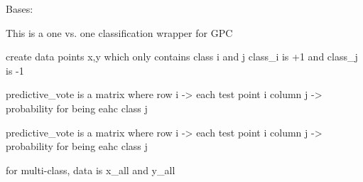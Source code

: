 \documentclass[letterpaper,10pt,english]{sphinxmanual}
\begin{document}

\begin{fulllineitems}
\label{pyGPs.Core:pyGPs.Core.gp.GPMC}
Bases: 

This is a one vs. one classification wrapper for GPC

\begin{fulllineitems}
\label{pyGPs.Core:pyGPs.Core.gp.GPMC.createBinaryClass}
create data points x,y which only contains class i and j
class\_i is +1 and class\_j is -1

\end{fulllineitems}


\begin{fulllineitems}
\label{pyGPs.Core:pyGPs.Core.gp.GPMC.fitAndPredict}
predictive\_vote is a matrix where
row i    -\textgreater{} each test point i
column j -\textgreater{} probability for being eahc class j

\end{fulllineitems}


\begin{fulllineitems}
\label{pyGPs.Core:pyGPs.Core.gp.GPMC.optimizeAndPredict}
predictive\_vote is a matrix where
row i    -\textgreater{} each test point i
column j -\textgreater{} probability for being eahc class j

\end{fulllineitems}


\begin{fulllineitems}
\label{pyGPs.Core:pyGPs.Core.gp.GPMC.setData}
for multi-class, data is x\_all and y\_all

\end{fulllineitems}



\end{fulllineitems}
\end{document}

